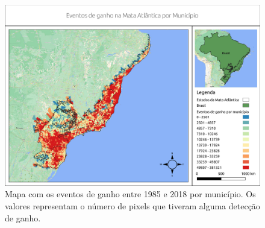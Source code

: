 \begin{figure}[H]
    \centering
    \includegraphics[scale=.5]{images/mun_gain_seg6_masked18_dur_gt4_inv_for.pdf}
    \caption{Mapa com os eventos de ganho entre 1985 e 2018 por município. Os valores representam o número de pixels que tiveram alguma detecção de ganho.}
    \label{fig:mun_gain}
\end{figure}

